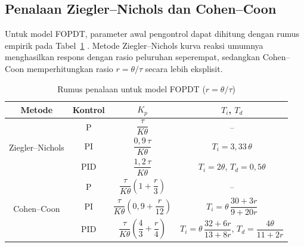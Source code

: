 \documentclass[11pt,a4paper]{article}
\renewcommand{\arraystretch}{1.2}
\begin{document}
\subsection{Penalaan Ziegler--Nichols dan Cohen--Coon}
Untuk model FOPDT, parameter awal pengontrol dapat dihitung dengan rumus empirik pada Tabel~\ref{tab:rumus_penalaan} \cite{seborg}. Metode Ziegler--Nichols kurva reaksi umumnya menghasilkan respons dengan rasio peluruhan seperempat, sedangkan Cohen--Coon memperhitungkan rasio $r = \theta/\tau$ secara lebih eksplisit.

\begin{table}[H]
\centering
\caption{Rumus penalaan untuk model FOPDT ($r = \theta/\tau$)}
\label{tab:rumus_penalaan}
\renewcommand{\arraystretch}{2.1}
\begin{tabular}{|c|c|c|c|}
\hline
\textbf{Metode} & \textbf{Kontrol} & $K_p$ & $T_i$, $T_d$ \\
\hline
\multirow{3}{*}{Ziegler--Nichols} & P & $\dfrac{\tau}{K\theta}$ & -- \\
\cline{2-4}
& PI & $\dfrac{0{,}9\,\tau}{K\theta}$ & $T_i = 3{,}33\,\theta$ \\
\cline{2-4}
& PID & $\dfrac{1{,}2\,\tau}{K\theta}$ & $T_i = 2\theta$, $T_d = 0{,}5\theta$ \\
\hline
\multirow{3}{*}{Cohen--Coon} & P & $\dfrac{\tau}{K\theta}\left(1 + \dfrac{r}{3}\right)$ & -- \\
\cline{2-4}
& PI & $\dfrac{\tau}{K\theta}\left(0{,}9 + \dfrac{r}{12}\right)$ & $T_i = \theta\,\dfrac{30 + 3r}{9 + 20r}$ \\
\cline{2-4}
& PID & $\dfrac{\tau}{K\theta}\left(\dfrac{4}{3} + \dfrac{r}{4}\right)$ & $T_i = \theta\,\dfrac{32 + 6r}{13 + 8r}$, $T_d = \dfrac{4\theta}{11 + 2r}$ \\
\hline
\end{tabular}
\end{table}
\end{document}

